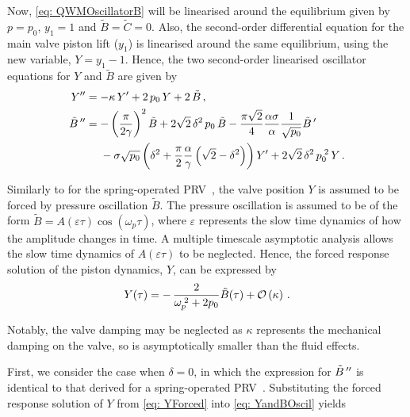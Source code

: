 Now, \cref{eq: QWMOscillatorB} will be linearised around the equilibrium given by $p = p_0$, $y_1 = 1$ and $\tilde{B} = \tilde{C} = 0$. Also, the second-order differential equation for the main valve piston lift ($y_1$) is linearised around the same equilibrium, using the new variable, $Y = y_1 - 1$. Hence, the two second-order linearised oscillator equations for $Y$ and $\tilde{B}$ are given by
~
\begin{equation} \label{eq: YandBOscil}
\begin{split}
    \ddash{Y} &= - \kappa \, \dash{Y} + 2 \, p_0 \, Y + 2 \, \tilde{B} \, , \\
    \ddash{\tilde{B}\,} &= - \left( \frac{\pi}{2 \gamma} \right)^2 \tilde{B} + 2 \sqrt{2} \, \delta^2 \, p_0 \, \tilde{B} - \frac{\pi \sqrt{2}}{4} \frac{\alpha \sigma}{\alpha} \frac{1}{\sqrt{p_0}} \dash{\tilde{B}\,}
    \\ & \quad \, \, %
    - \sigma \sqrt{p_0} \left( \delta^2 + \frac{\pi}{2} \frac{\alpha}{\gamma} \left( \sqrt{2} - \delta^2 \right) \right) \dash{Y} + 2 \sqrt{2} \, \delta^2 \, p_0\power{2} \, Y \, .
\end{split}
\end{equation}

Similarly to for the spring-operated PRV~\cite{Hos2015ModelPipe}, the valve position $Y$ is assumed to be forced by pressure oscillation $\tilde{B}$. The pressure oscillation is assumed to be of the form $\tilde{B} = A(\varepsilon \tau) \cos\left( \omega_p \tau \right)$, where $\varepsilon$ represents the slow time dynamics of how the amplitude changes in time. A multiple timescale asymptotic analysis allows the slow time dynamics of $A(\varepsilon \tau)$ to be neglected. Hence, the forced response solution of the piston dynamics, $Y$, can be expressed by
~
\begin{equation} \label{eq: YForced}
    Y(\tau) = - \, \frac{2}{\omega_p^{\;2} + 2 p_0} \tilde{B}(\tau) + \mathcal{O}\left( \kappa \right) \, .
\end{equation}

Notably, the valve damping may be neglected as $\kappa$ represents the mechanical damping on the valve, so is asymptotically smaller than the fluid effects.

First, we consider the case when $\delta = 0$, in which the expression for $\tilde{B}\,{''}$ is identical to that derived for a spring-operated PRV~\cite{Hos2015DynamicModelling}. Substituting the forced response solution of $Y$ from \cref{eq: YForced} into \cref{eq: YandBOscil} yields

